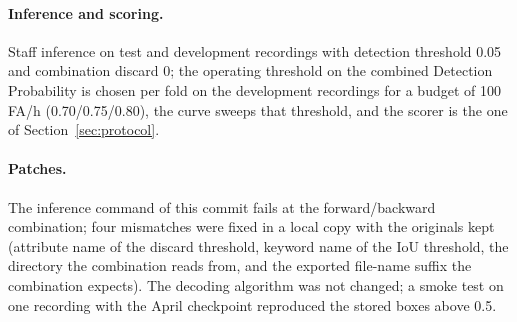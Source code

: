 \documentclass[10pt,twocolumn]{article}
\begin{document}
\paragraph{Inference and scoring.} Staff inference on test and development recordings with detection threshold 0.05 and combination discard 0; the operating threshold on the combined Detection Probability is chosen per fold on the development recordings for a budget of 100 FA/h (0.70/0.75/0.80), the curve sweeps that threshold, and the scorer is the one of Section~\ref{sec:protocol}.
\paragraph{Patches.} The inference command of this commit fails at the forward/backward combination; four mismatches were fixed in a local copy with the originals kept (attribute name of the discard threshold, keyword name of the IoU threshold, the directory the combination reads from, and the exported file-name suffix the combination expects). The decoding algorithm was not changed; a smoke test on one recording with the April checkpoint reproduced the stored boxes above 0.5.
\end{document}
